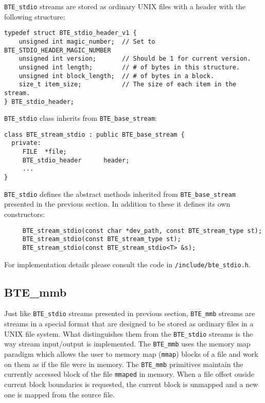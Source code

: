 \verb|BTE_stdio| streams are stored as ordinary UNIX files with a header
with the following structure:

\begin{verbatim}
typedef struct BTE_stdio_header_v1 { 
    unsigned int magic_number;  // Set to BTE_STDIO_HEADER_MAGIC_NUMBER
    unsigned int version;       // Should be 1 for current version.
    unsigned int length;        // # of bytes in this structure.
    unsigned int block_length;  // # of bytes in a block.
    size_t item_size;           // The size of each item in the stream.
} BTE_stdio_header;
\end{verbatim}

\verb|BTE_stdio| class inherits from \verb|BTE_base_stream|:
\begin{verbatim}
class BTE_stream_stdio : public BTE_base_stream {
  private:
     FILE  *file;          
     BTE_stdio_header      header;
     ...
}  
\end{verbatim}

\verb|BTE_stdio| defines the abstract methods inherited from
\verb|BTE_base_stream| presented in the previous section. In addition to
these it defines its own constructors:
\begin{verbatim}
     BTE_stream_stdio(const char *dev_path, const BTE_stream_type st); 
     BTE_stream_stdio(const BTE_stream_type st); 
     BTE_stream_stdio(const BTE_stream_stdio<T> &s);
\end{verbatim}

For implementation details please consult the code in
\verb|/include/bte_stdio.h|.



\subsection{BTE\_mmb}

Just like \verb|BTE_stdio| streams presented in previous section,
\verb|BTE_mmb| streams are streams in a special format that are designed to
be stored as ordinary files in a UNIX file system. What distinguishes them
from the \verb|BTE_stdio| streams is the way stream input/output is
implemented. The \verb|BTE_mmb| uses the memory map paradigm which allows
the user to memory map (\verb|mmap|) blocks of a file and work on them as
if the file were in memory. The \verb|BTE_mmb| primitives maintain the
currently accessed block of the file \verb|mmaped| in memory. When a file
offset ouside current block boundaries is requested, the current block is
unmapped and a new one is mapped from the source file.


